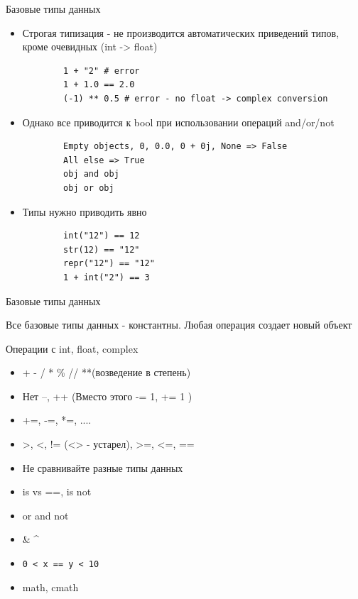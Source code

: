 \documentclass{article}
\begin{document}
\begin{center} Базовые типы данных \end{center}
\begin{itemize}
	\item Строгая типизация - не производится автоматических приведений типов, кроме очевидных (int -> float)
	\vspace{15pt}
	\begin{lstlisting}
		1 + "2" # error
		1 + 1.0 == 2.0
		(-1) ** 0.5 # error - no float -> complex conversion
	\end{lstlisting}

	\item Однако все приводится к bool при использовании операций and/or/not
	\begin{lstlisting}
		Empty objects, 0, 0.0, 0 + 0j, None => False
		All else => True
		obj and obj
		obj or obj
	\end{lstlisting}

	\item Типы нужно приводить явно
	\vspace{15pt}
	\begin{lstlisting}
		int("12") == 12
		str(12) == "12"
		repr("12") == "12"
		1 + int("2") == 3
	\end{lstlisting}
\end{itemize}
\newpage

\begin{center} Базовые типы данных \end{center}
Все базовые типы данных - константны. Любая операция создает новый объект
\newpage

\begin{center} Операции с int,  float, complex \end{center}
\begin{itemize}
	\item + - / * \% // **(возведение в степень)
	\item Нет --, ++ (Вместо этого -= 1, += 1 )
	\item +=, -=, *=, ....
	\item >, <, != (<> - устарел), >=, <=, == 
	\item Не сравнивайте разные типы данных
	\item is vs ==, is not
	\item or and not
	\item \& \hspace{10pt} \textbar \hspace{10pt} \textasciicircum
	\item \lstinline!0 < x == y < 10!
	\item math, cmath
\end{itemize}
\newpage
\end{document}
